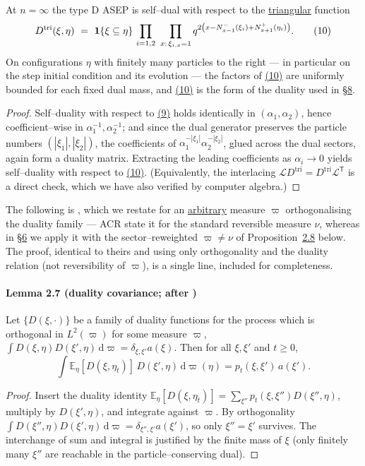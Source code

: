 \documentclass[11pt]{article}
\theoremstyle{plain}
\theoremstyle{definition}
\theoremstyle{remark}
\newcommand{\E}{\mathbb{E}}\newcommand{\PP}{\mathbb{P}}\newcommand{\dd}{\,\mathrm{d}}
\newcommand{\cL}{\mathcal L}\newcommand{\cO}{\mathcal O}\newcommand{\cE}{\mathcal E}
\begin{document}
At $n=\infty$ the type D ASEP is self--dual with respect to the \underline{triangular}
function
\label{eq_Dtri}
\begin{equation}
  D^{\mathrm{tri}}(\xi,\eta)\ =\ \bone\{\xi\subseteq\eta\}\,
  \prod_{i=1,2}\ \prod_{x:\,\xi_{i,x}=1}
  q^{2\left(x-N^-_{x-1}(\xi_i)+N^+_{x+1}(\eta_i)\right)}.\qquad(10)
\end{equation}
On configurations $\eta$ with finitely many particles to
the right --- in particular on the step initial condition and its evolution --- the
factors of \hyperref[eq_Dtri]{(10)} are uniformly bounded for each fixed dual mass, and
\hyperref[eq_Dtri]{(10)} is the form of the duality used in \S\hyperref[sec_tw]{8}.
\par
\begin{proof}
Self--duality with respect to \hyperref[eq_Dreu]{(9)} holds identically in
$(\alpha_1,\alpha_2)$, hence coefficient--wise in $\alpha_1^{-1},\alpha_2^{-1}$; and
since the dual generator preserves the particle numbers $(|\xi_1|,|\xi_2|)$, the
coefficients of $\alpha_1^{-|\xi_1|}\alpha_2^{-|\xi_2|}$, glued across the dual
sectors, again form a duality matrix. Extracting the leading coefficients as
$\alpha_i\to0$ yields self--duality with respect to \hyperref[eq_Dtri]{(10)}. (Equivalently,
the interlacing $\cL D^{\mathrm{tri}}=D^{\mathrm{tri}}\cL^{\mathsf T}$ is a direct
check, which we have also verified by computer algebra.)
\end{proof}

The following is \cite[Lem.~2.1]{ACR}, which we restate for an \underline{arbitrary}
measure $\varpi$ orthogonalising the duality family --- ACR state it for the standard
reversible measure $\nu$, whereas in \S\hyperref[sec_ew]{6} we apply it with the
sector--reweighted $\varpi\ne\nu$ of Proposition~\hyperref[prop_orth]{2.8} below. The proof, identical
to theirs and using only orthogonality and the duality relation (not reversibility of
$\varpi$), is a single line, included for completeness.

\paragraph{Lemma 2.7 (duality covariance; {after \cite[Lem.~2.1]{ACR}})}\label{lem_acr}

Let $\{D(\xi,\cdot)\}$ be a family of duality functions for the process which is
orthogonal in $L^2(\varpi)$ for some measure $\varpi$,
$\int D(\xi,\eta)D(\xi',\eta)\dd\varpi=\delta_{\xi,\xi'}a(\xi)$. Then for all
$\xi,\xi'$ and $t\ge0$,
\[
  \int \E_\eta[D(\xi,\eta_t)]\,D(\xi',\eta)\dd\varpi(\eta)=p_t(\xi,\xi')\,a(\xi').
\]
\par
\begin{proof}
Insert the duality identity
$\E_\eta[D(\xi,\eta_t)]=\sum_{\xi''}p_t(\xi,\xi'')D(\xi'',\eta)$, multiply by
$D(\xi',\eta)$, and integrate against $\varpi$. By orthogonality
$\int D(\xi'',\eta)D(\xi',\eta)\dd\varpi=\delta_{\xi'',\xi'}a(\xi')$, so only
$\xi''=\xi'$
survives. The interchange of sum and integral is justified by the finite mass of
$\xi$ (only finitely many $\xi''$ are reachable in the particle--conserving dual).
\end{proof}
\end{document}
